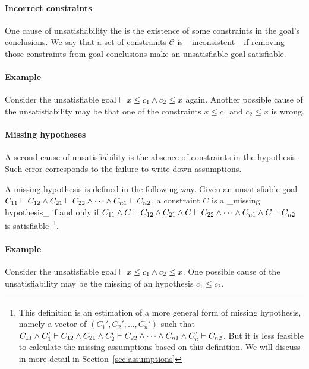 \paragraph{Incorrect constraints}

One cause of unsatisfiability the is the existence of some constraints
in the goal's conclusions. We say that a set of constraints
$\mathcal{C}$ is _inconsistent_ if removing those constraints from
goal conclusions make an unsatisfiable goal satisfiable.

\paragraph{Example}

Consider the unsatisfiable goal $\vdash x \leq c_1 \land c_2 \leq x$
again. Another possible cause of the unsatisfiability may be that one
of the constraints $x \leq c_1$ and $c_2 \leq x$ is wrong. 

\paragraph{Missing hypotheses}

A second cause of unsatisfiability is the absence of constraints in
the hypothesis. Such error corresponds to the failure to write down
assumptions.

A missing hypothesis is defined in the following way.
Given an unsatisfiable goal $C_{11} \vdash C_{12} \land C_{21} \vdash C_{22}
\land \dots \land C_{n1} \vdash C_{n2}$, a constraint $C$ is a _missing
hypothesis_ if and only if $C_{11} \land C \vdash C_{12} \land C_{21} \land C
\vdash C_{22} \land \dots \land C_{n1} \land C \vdash C_{n2}$ is
satisfiable~\footnote{This definition is an estimation of a more general form
of missing hypothesis, namely a vector of $(C_1', C_2', \dots, C_n')$ such that
$C_{11} \land C_1' \vdash C_{12} \land C_{21} \land C_2' \vdash C_{22} \land
\dots \land C_{n1} \land C_n' \vdash C_{n2}$. But it is less feasible to
calculate the missing assumptions based on this definition. We will discuss in
more detail in Section~\ref{sec:assumptions}}.

\paragraph{Example}
Consider the unsatisfiable goal $\vdash x \leq c_1 \land c_2 \leq x$.
One possible cause of the unsatisfiability may be the missing of an
hypothesis $c_1\leq c_2$.

